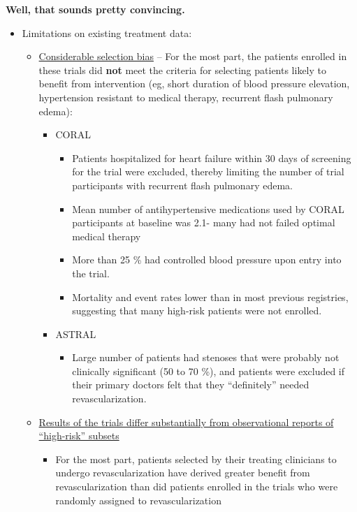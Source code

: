 \documentclass[
]{book}
\providecommand{\tightlist}{%
  \setlength{\itemsep}{0pt}\setlength{\parskip}{0pt}}
\begin{document}
\textbf{Well, that sounds pretty convincing.}

\begin{itemize}
\item
  Limitations on existing treatment data:

  \begin{itemize}
  \item
    \uline{Considerable selection bias} -- For the most part,
    the patients enrolled in these trials did \textbf{not} meet the
    criteria for selecting patients likely to benefit from
    intervention (eg, short duration of blood pressure elevation,
    hypertension resistant to medical therapy, recurrent flash
    pulmonary edema):

    \begin{itemize}
    \item
      CORAL \citep{cooperStentingMedicalTherapy2014}

      \begin{itemize}
      \item
        Patients hospitalized for heart failure within 30 days
        of screening for the trial were excluded, thereby
        limiting the number of trial participants with recurrent
        flash pulmonary edema.
      \item
        Mean number of antihypertensive medications used by
        CORAL participants at baseline was 2.1- many had not
        failed optimal medical therapy
      \item
        More than 25 \% had controlled blood pressure upon entry
        into the trial.
      \item
        Mortality and event rates lower than in most previous
        registries, suggesting that many high-risk patients were
        not enrolled.
      \end{itemize}
    \item
      ASTRAL
      \citep{astralinvestigatorsRevascularizationMedicalTherapy2009}

      \begin{itemize}
      \tightlist
      \item
        Large number of patients had stenoses that were probably
        not clinically significant (50 to 70 \%), and patients
        were excluded if their primary doctors felt that they
        ``definitely'' needed revascularization.
      \end{itemize}
    \end{itemize}
  \item
    \uline{Results of the trials differ substantially from observational
    reports of ``high-risk'' subsets}

    \begin{itemize}
    \tightlist
    \item
      For the most part, patients selected by their treating
      clinicians to undergo revascularization have derived greater
      benefit from revascularization than did patients enrolled in
      the trials who were randomly assigned to revascularization
    \end{itemize}
  \end{itemize}
\end{itemize}
\end{document}
